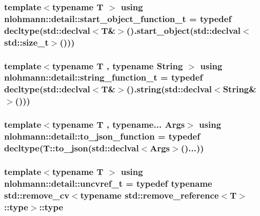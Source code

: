 \subsubsection[{\texorpdfstring{start\+\_\+object\+\_\+function\+\_\+t}{start_object_function_t}}]{\setlength{\rightskip}{0pt plus 5cm}template$<$typename T $>$ using {\bf nlohmann\+::detail\+::start\+\_\+object\+\_\+function\+\_\+t} = typedef decltype(std\+::declval$<$T\&$>$().start\+\_\+object(std\+::declval$<$std\+::size\+\_\+t$>$()))}\hypertarget{namespacenlohmann_1_1detail_a5fff1e6dcaabd367d9b1109a5682f9d4}{}\label{namespacenlohmann_1_1detail_a5fff1e6dcaabd367d9b1109a5682f9d4}
\subsubsection[{\texorpdfstring{string\+\_\+function\+\_\+t}{string_function_t}}]{\setlength{\rightskip}{0pt plus 5cm}template$<$typename T , typename String $>$ using {\bf nlohmann\+::detail\+::string\+\_\+function\+\_\+t} = typedef decltype(std\+::declval$<$T\&$>$().string(std\+::declval$<$String\&$>$()))}\hypertarget{namespacenlohmann_1_1detail_a27c3fc3bd42ac406f763184aa8ae4cb0}{}\label{namespacenlohmann_1_1detail_a27c3fc3bd42ac406f763184aa8ae4cb0}
\subsubsection[{\texorpdfstring{to\+\_\+json\+\_\+function}{to_json_function}}]{\setlength{\rightskip}{0pt plus 5cm}template$<$typename T , typename... Args$>$ using {\bf nlohmann\+::detail\+::to\+\_\+json\+\_\+function} = typedef decltype(T\+::to\+\_\+json(std\+::declval$<$Args$>$()...))}\hypertarget{namespacenlohmann_1_1detail_af846b6cf2f926009ff3a7a61495ca383}{}\label{namespacenlohmann_1_1detail_af846b6cf2f926009ff3a7a61495ca383}
\subsubsection[{\texorpdfstring{uncvref\+\_\+t}{uncvref_t}}]{\setlength{\rightskip}{0pt plus 5cm}template$<$typename T $>$ using {\bf nlohmann\+::detail\+::uncvref\+\_\+t} = typedef typename std\+::remove\+\_\+cv$<$typename std\+::remove\+\_\+reference$<$T$>$\+::type$>$\+::type}\hypertarget{namespacenlohmann_1_1detail_a53a082eedad9f4729fcd8fed552a21f7}{}\label{namespacenlohmann_1_1detail_a53a082eedad9f4729fcd8fed552a21f7}
